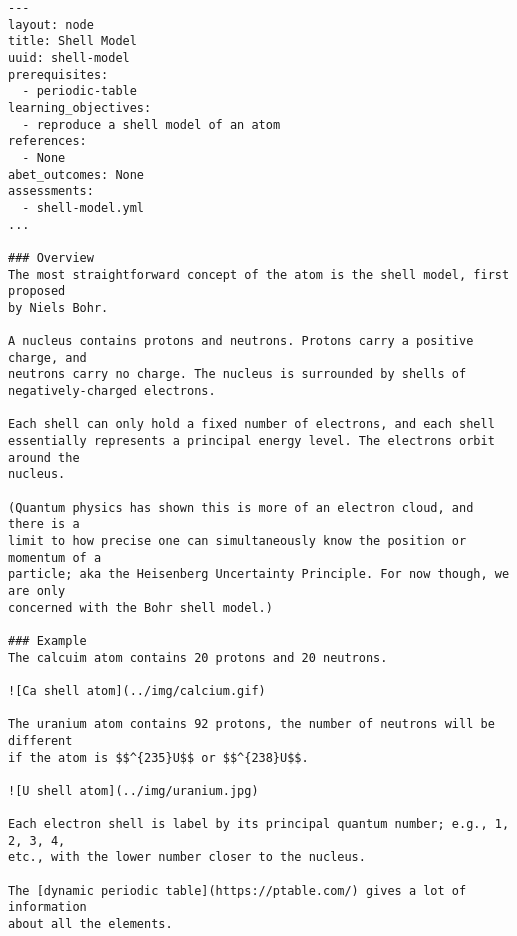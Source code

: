 \documentclass{article}
\begin{document}
\begin{verbatim}
---
layout: node
title: Shell Model
uuid: shell-model
prerequisites:
  - periodic-table
learning_objectives: 
  - reproduce a shell model of an atom 
references:
  - None
abet_outcomes: None
assessments: 
  - shell-model.yml 
...

### Overview
The most straightforward concept of the atom is the shell model, first proposed 
by Niels Bohr.

A nucleus contains protons and neutrons. Protons carry a positive charge, and 
neutrons carry no charge. The nucleus is surrounded by shells of 
negatively-charged electrons.

Each shell can only hold a fixed number of electrons, and each shell 
essentially represents a principal energy level. The electrons orbit around the 
nucleus. 

(Quantum physics has shown this is more of an electron cloud, and there is a 
limit to how precise one can simultaneously know the position or momentum of a 
particle; aka the Heisenberg Uncertainty Principle. For now though, we are only 
concerned with the Bohr shell model.)

### Example
The calcuim atom contains 20 protons and 20 neutrons.

![Ca shell atom](../img/calcium.gif)

The uranium atom contains 92 protons, the number of neutrons will be different 
if the atom is $$^{235}U$$ or $$^{238}U$$.

![U shell atom](../img/uranium.jpg)

Each electron shell is label by its principal quantum number; e.g., 1, 2, 3, 4, 
etc., with the lower number closer to the nucleus.
    
The [dynamic periodic table](https://ptable.com/) gives a lot of information 
about all the elements.
\end{verbatim}
\end{document}
